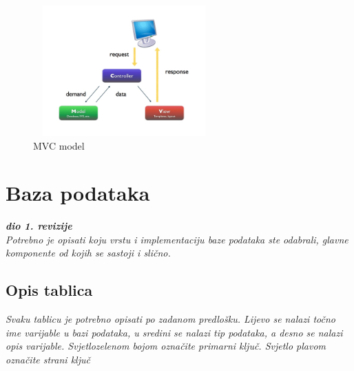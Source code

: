                     \begin{figure}[H]
                     \includegraphics[width=7cm, height=5cm ]{./slike/mvc.jpg}
                      \centering
                      \caption{MVC model}
                    \end{figure}
                    
                                 

			
		\section{Baza podataka}
			
			\textbf{\textit{dio 1. revizije}}\\
			
		\textit{Potrebno je opisati koju vrstu i implementaciju baze podataka ste odabrali, glavne komponente od kojih se sastoji i slično.}
		
			\subsection{Opis tablica}
			

				\textit{Svaku tablicu je potrebno opisati po zadanom predlošku. Lijevo se nalazi točno ime varijable u bazi podataka, u sredini se nalazi tip podataka, a desno se nalazi opis varijable. Svjetlozelenom bojom označite primarni ključ. Svjetlo plavom označite strani ključ}
				

